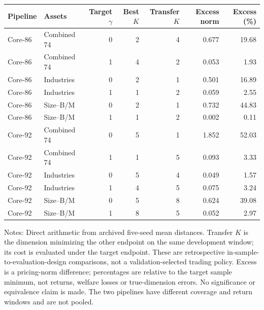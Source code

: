 \begin{widetable}[!tbp]
\centering\small
\caption{Cost of transferring the preferred dimension between evaluation endpoints}
\label{tab:transfer-cost}
\begin{tabular}{llrrrrr}
\toprule Pipeline & Assets & Target $\gamma$ & Best $K$ & Transfer $K$ & Excess norm & Excess (\%) \\
\midrule
Core-86 & Combined 74 & 0 & 2 & 4 & 0.677 & 19.68 \\
Core-86 & Combined 74 & 1 & 4 & 2 & 0.053 & 1.93 \\
Core-86 & Industries & 0 & 2 & 1 & 0.501 & 16.89 \\
Core-86 & Industries & 1 & 1 & 2 & 0.059 & 2.55 \\
Core-86 & Size--B/M & 0 & 2 & 1 & 0.732 & 44.83 \\
Core-86 & Size--B/M & 1 & 1 & 2 & 0.002 & 0.11 \\
Core-92 & Combined 74 & 0 & 5 & 1 & 1.852 & 52.03 \\
Core-92 & Combined 74 & 1 & 1 & 5 & 0.093 & 3.33 \\
Core-92 & Industries & 0 & 5 & 4 & 0.049 & 1.57 \\
Core-92 & Industries & 1 & 4 & 5 & 0.075 & 3.24 \\
Core-92 & Size--B/M & 0 & 5 & 8 & 0.624 & 39.08 \\
Core-92 & Size--B/M & 1 & 8 & 5 & 0.052 & 2.97 \\
\bottomrule\end{tabular}
\par\smallskip\begin{minipage}{0.97\textwidth}\footnotesize Notes: Direct arithmetic from archived five-seed mean distances. Transfer $K$ is the dimension minimizing the other endpoint on the same development window; its cost is evaluated under the target endpoint. These are retrospective in-sample-to-evaluation-design comparisons, not a validation-selected trading policy. Excess is a pricing-norm difference; percentages are relative to the target sample minimum, not returns, welfare losses or true-dimension errors. No significance or equivalence claim is made. The two pipelines have different coverage and return windows and are not pooled.\end{minipage}
\end{widetable}
